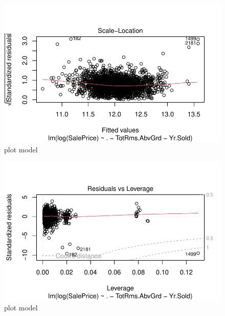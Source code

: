 \documentclass[
  letterpaper,
  DIV=11,
  numbers=noendperiod]{scrartcl}
\begin{document}
\begin{figure}[H]

{\centering \includegraphics{paper_files/figure-pdf/plot1-3.pdf}

}

\caption{plot model}

\end{figure}%

\begin{figure}[H]

{\centering \includegraphics{paper_files/figure-pdf/plot1-4.pdf}

}

\caption{plot model}

\end{figure}%
\end{document}
